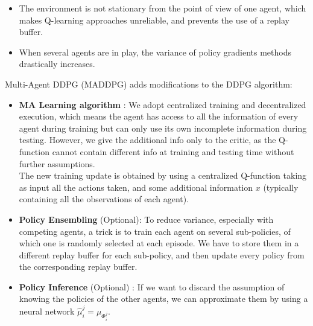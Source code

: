 \documentclass[10pt,landscape]{article}
\begin{document}
\begin{multicols}{3}
\begin{itemize}[leftmargin=*]
    \item The environment is not stationary from the point of view of one agent, which makes Q-learning approaches unreliable, and prevents the use of a replay buffer.
    \item When several agents are in play, the variance of policy gradients methods drastically increases.
\end{itemize}
\medskip
Multi-Agent DDPG (MADDPG) adds modifications to the DDPG algorithm:\\
\begin{itemize}[leftmargin=*]
   \item \textbf{MA Learning algorithm} : We adopt centralized training and decentralized execution, which means the agent has access to all the information of every agent during training but can only use its own incomplete information during testing. However, we give the additional info only to the critic, as the Q-function cannot contain different info at training and testing time without further assumptions.\\
    The new training update is obtained by using a centralized Q-function taking as input all the actions taken, and some additional information $x$ (typically containing all the observations of each agent).
    \item \textbf{Policy Ensembling} (Optional): To reduce variance, especially with competing agents, a trick is to train each agent on several sub-policies, of which one is randomly selected at each episode. We have to store them in a different replay buffer for each sub-policy, and then update every policy from the corresponding replay buffer.
    \item \textbf{Policy Inference} (Optional) : If we want to discard the assumption of knowing the policies of the other agents, we can approximate them by using a neural network $\hat{\mu}_i^j = \mu_{\Phi_i^j}$.
\end{itemize}




\end{multicols}
\end{document}

